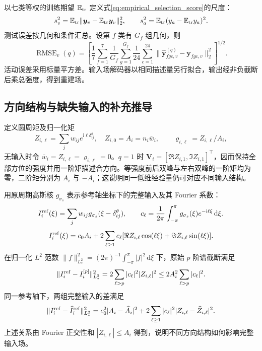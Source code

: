 \documentclass[UTF8,fontset=windows,11pt]{ctexart}
\begin{document}
以七类等权的训练期望 $\mathbb E_{\rm tr}$ 定义式\eqref{eq:empirical_selection_score}的尺度：
\begin{equation}
 s_v^2=\mathbb E_{\rm tr}\|\boldsymbol y_v-\mathbb E_{\rm tr}\boldsymbol y_v\|_2^2,\qquad
 s_a^2=\mathbb E_{\rm tr}(y_a-\mathbb E_{\rm tr}y_a)^2.
\end{equation}
测试误差按几何和条件汇总。设第 $f$ 类有 $G_f$ 组几何，则
\begin{equation}
 \operatorname{RMSE}_{v}(q)=\left[\frac17\sum_{f=1}^{7}\frac1{G_f}\sum_{g=1}^{G_f}
 \frac1{24}\sum_{c=1}^{24}\|\widehat{\boldsymbol y}^{(q)}_{fgc,v}-\boldsymbol y_{fgc,v}\|_2^2\right]^{1/2}.
 \label{eq:challenge1_vector_error}
\end{equation}
活动误差采用标量平方差。输入场解码器以相同描述量另行拟合，输出经非负截断后乘总强度，得到重建场。

\subsection{方向结构与缺失输入的补充推导}\label{app:direction_structure}
定义圆周矩及归一化矩
\begin{equation}
 Z_{i,\ell}=\sum_jw_{ij}e^{\mathrm i\ell\delta^\theta_{ij}},\quad
 Z_{i,0}=A_i=n_i\bar w_i,\qquad\varrho_{i,\ell}=Z_{i,\ell}/A_i,
 \label{eq:strength_circular_moments}
\end{equation}
无输入时令 $\bar w_i=Z_{i,\ell}=\varrho_{i,\ell}=0$。$q=1$ 时 $\boldsymbol V_i=[\Re Z_{i,1},\Im Z_{i,1}]^\top$，因而保持全部方位的强度并用一阶矩描述合方向。等强度前后双峰与左右双峰的一阶矩均为零，二阶矩分别为 $A_i$ 与 $-A_i$；这说明同一低维经验量仍可对应不同输入结构。

用原周期高斯核 $g_{\sigma_s}$ 表示参考轴坐标下的完整输入及其 Fourier 系数：
\begin{equation}
 I_i^{\rm ref}(\xi)=\sum_jw_{ij}g_{\sigma_s}(\xi-\delta^\theta_{ij}),\qquad
 c_\ell=\frac1{2\pi}\int_{-\pi}^{\pi}g_{\sigma_s}(\xi)e^{-\mathrm i\ell\xi}\,\mathrm d\xi.
 \label{eq:social_field_fourier_coefficients}
\end{equation}
\begin{equation}
 I_i^{\rm ref}(\xi)=c_0A_i+2\sum_{\ell\ge1}c_\ell
 [\Re Z_{i,\ell}\cos(\ell\xi)+\Im Z_{i,\ell}\sin(\ell\xi)].
 \label{eq:social_field_moment_expansion}
\end{equation}
在归一化 $L^2$ 范数 $\|f\|_{L^2_*}^2=(2\pi)^{-1}\int_{-\pi}^{\pi}|f|^2\,\mathrm d\xi$ 下，原始 $p$ 阶谱截断满足
\begin{equation}
 \|I_i^{\rm ref}-I_i^{[p]}\|_{L^2_*}^2
 =2\sum_{\ell>p}|c_\ell|^2|Z_{i,\ell}|^2
 \le2A_i^2\sum_{\ell>p}|c_\ell|^2.
 \label{eq:social_field_parseval_tail}
\end{equation}
同一参考轴下，两组完整输入的差满足
\begin{equation}
 \|I_i^{\rm ref}-\widehat I_i^{\rm ref}\|_{L^2_*}^2
 =c_0^2|A_i-\widehat A_i|^2+2\sum_{\ell\ge1}|c_\ell|^2|Z_{i,\ell}-\widehat Z_{i,\ell}|^2.
 \label{eq:social_field_error_decomposition}
\end{equation}
上述关系由 Fourier 正交性和 $|Z_{i,\ell}|\le A_i$ 得到，说明不同方向结构如何影响完整输入场。
\end{document}
